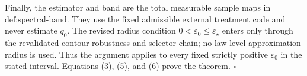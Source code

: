 Finally, the estimator and band are the total measurable sample maps in \(\text{def:spectral-band}\).  They use the fixed admissible external treatment code and never estimate \(q_0\).  The revised radius condition \(0<\varepsilon_0\le\varepsilon_\star\) enters only through the revalidated contour-robustness and selector chain; no law-level approximation radius is used.  Thus the argument applies to every fixed strictly positive \(\varepsilon_0\) in the stated interval.  Equations (3), (5), and (6) prove the theorem. \(\square\)